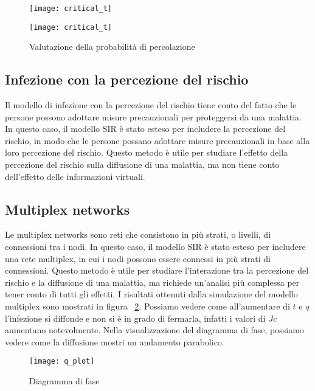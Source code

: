     \begin{figure}[h]
        \begin{minipage}{0.5\textwidth}
            \texttt{[image: critical\_t]}\label{fig:prob_percolation}
        \end{minipage}
        \begin{minipage}{0.5\textwidth}
            \texttt{[image: critical\_t]}\label{fig:prob_percolation_2}
        \end{minipage}
        \caption{Valutazione della probabilità di percolazione}
    \end{figure}

\subsection{Infezione con la percezione del rischio}\label{subsec:res-infezione-con-la-percezione-del-rischio}
    Il modello di infezione con la percezione del rischio tiene conto del fatto che le persone possono adottare misure
    precauzionali per proteggersi da una malattia.
    In questo caso, il modello SIR è stato esteso per includere la percezione del rischio, in modo che le persone possano
    adottare misure precauzionali in base alla loro percezione del rischio.
    Questo metodo è utile per studiare l'effetto della percezione del rischio sulla diffusione di una malattia, ma non
    tiene conto dell'effetto delle informazioni virtuali.

\subsection{Multiplex networks}\label{subsec:res-multiplex-networks}
    Le multiplex networks sono reti che consistono in più strati, o livelli, di connessioni tra i nodi.
    In questo caso, il modello SIR è stato esteso per includere una rete multiplex, in cui i nodi possono essere connessi
    in più strati di connessioni.
    Questo metodo è utile per studiare l'interazione tra la percezione del rischio e la diffusione di una malattia, ma
    richiede un'analisi più complessa per tener conto di tutti gli effetti.
    I risultati ottenuti dalla simulazione del modello multiplex sono mostrati in figura ~\ref{fig:diagram_phase}.
    Possiamo vedere come all'aumentare di $t$ e $q$ l'infezione si diffonde e non si è in grado di fermarla, infatti i
    valori di $Jc$ aumentano notevolmente.
    Nella visualizzazione del diagramma di fase, possiamo vedere come la diffusione mostri un andamento parabolico.

    \begin{figure}[h]
        \texttt{[image: q\_plot]}\label{fig:diagram_phase}
        \caption{Diagramma di fase}
    \end{figure}
